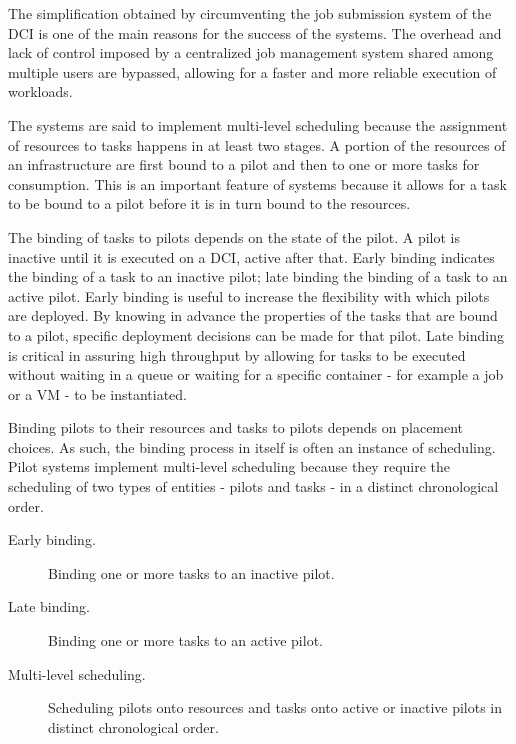 \documentclass{sig-alternate}
\begin{document}
The simplification obtained by circumventing the job submission system of the
DCI is one of the main reasons for the success of the \pilotjob systems. The
overhead and lack of control imposed by a centralized job management system
shared among multiple users are bypassed, allowing for a faster and more
reliable execution of workloads.

The \pilotjob systems are said to implement multi-level scheduling because the
assignment of resources to tasks happens in at least two stages. A portion of
the resources of an infrastructure are first bound to a pilot and then to one
or more tasks for consumption. This is an important feature of \pilotjob
systems because it allows for a task to be bound to a pilot before it is in
turn bound to the resources.

The binding of tasks to pilots depends on the state of the pilot. A pilot is
inactive until it is executed on a DCI, active after that. Early binding
indicates the binding of a task to an inactive pilot; late binding the binding
of a task to an active pilot. Early binding is useful to increase the
flexibility with which pilots are deployed. By knowing in advance the
properties of the tasks that are bound to a pilot, specific deployment
decisions can be made for that pilot. Late binding is critical in assuring high
throughput by allowing for tasks to be executed without waiting in a queue or
waiting for a specific container - for example a job or a VM - to be
instantiated.

Binding pilots to their resources and tasks to pilots depends on placement
choices. As such, the binding process in itself is often an instance of
scheduling. Pilot systems implement multi-level scheduling because they require
the scheduling of two types of entities - pilots and tasks - in a distinct
chronological order. 

\begin{description}

\item[Early binding.] Binding one or more tasks to an inactive pilot.

\item[Late binding.] Binding one or more tasks to an active pilot.

\item[Multi-level scheduling.] Scheduling pilots onto resources and tasks onto
active or inactive pilots in distinct chronological order.

\end{description}
\end{document}
